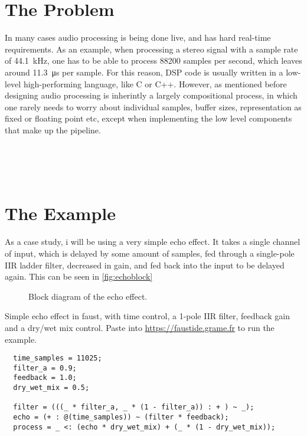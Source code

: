 \section{The Problem}

In many cases audio processing is being done live, and has hard real-time requirements. As an example, when
processing a stereo signal with a sample rate of \SI{44.1}{kHz}, one has to be able to process
\num{88200} samples per second, which leaves around \SI{11.3}{\micro\second} per sample. For this
reason, DSP code is usually written in a low-level high-performing language, like C or C++. However, as
mentioned before designing audio processing is inherintly a largely compositional process, in which one
rarely needs to worry about individual samples, buffer sizes, representation as fixed or floating point etc,
except when implementing the low level components that make up the pipeline.

 \\
 \\
 \\

\section{The Example}

As a case study, i will be using a very simple echo effect. It takes a single channel of input, which is
delayed by some amount of samples, fed through a single-pole IIR ladder filter, decreased in gain, and fed
back into the input to be delayed again. This can be seen in \autoref{fig:echoblock}

\begin{figure}
  \centering
  
  \caption{Block diagram of the echo effect.}
  \label{fig:echoblock}
\end{figure}

\begin{listing}
  \label{lst:faustecho}
  \caption{
    Simple echo effect in faust, with time control, a 1-pole IIR filter, feedback gain and a dry/wet mix control. Paste into \url{https://faustide.grame.fr} to run the example.
  }
  \begin{verbatim}
  time_samples = 11025;
  filter_a = 0.9;
  feedback = 1.0; 
  dry_wet_mix = 0.5;

  filter = (((_ * filter_a, _ * (1 - filter_a)) : + ) ~ _);
  echo = (+ : @(time_samples)) ~ (filter * feedback);
  process = _ <: (echo * dry_wet_mix) + (_ * (1 - dry_wet_mix));
  \end{verbatim}
\end{listing}

